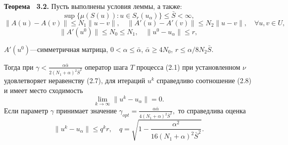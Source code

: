 \documentclass[10pt,pdf, mathserif, hyperref={unicode}]{beamer}
\begin{document}
\begin{frame}
	\begin{block}{\bf Теорема ~3.2.}
		Пусть выполнены условия леммы, а также: \quad $$\sup\{\mu(S(u)): u\in S_r(u_\alpha)\}\le\bar S <\infty,$$ 
		\smallskip
		$$\|A(u)-A(v)\|\le N_1\|u-v\|,\quad
		\|A'(u)-A'(v)\|\le N_2\|u-v\|, \quad \forall u, v \in U,$$
		\smallskip
		$$\|A'(u^0)\| \le N_0\le N_1, \quad \|u^0-u_\alpha\| \le r,$$
		
		\smallskip
		$A'(u^0)$---симметричная матрица, $0<\alpha\le\bar\alpha$, $\bar\alpha\ge 4N_0$, $r\le\alpha/8N_2\bar S$.
		
		\smallskip
		Тогда при
		$\gamma<\frac{\alpha\bar\alpha}{2(N_1+\alpha)^2\bar S^2}$
		оператор шага $T$ процесса (2.1) при установленном $\nu$
		удовлетворяет неравенству (2.7), для итераций $u^k$ справедливо соотношение (2.8) и имеет место сходимость
		$$\lim_{k\to\infty}\|u^k-u_\alpha\|=0.$$
		Если параметр $\gamma$ принимает значение ${\gamma}_{opt}=\frac{\alpha\bar\alpha}{4(N_1+\alpha)^2\bar S^2},$ то справедлива оценка $$\|u^k-u_\alpha\|\le q^k r, \quad q=\sqrt{1-\frac{\alpha ^2}{16(N_1+\alpha)^2\bar S^2}}.$$
	\end{block}
\end{frame}
\end{document}
